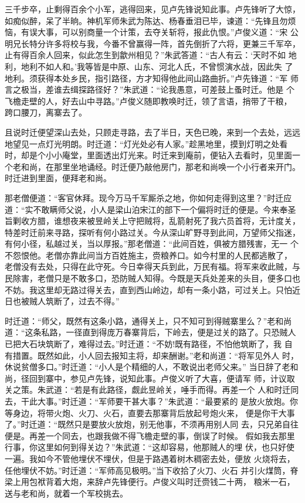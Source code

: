 三千步卒，止剩得百余个小军，逃得回来，见卢先锋说知此事。卢先锋听了大惊，
如痴似醉，呆了半晌。神机军师朱武为陈达、杨春垂泪已毕，谏道：“先锋且勿烦
恼，有误大事，可以别商量一个计策，去夺关斩将，报此仇恨。”卢俊义道：“宋
公明兄长特分许多将校与我，今番不曾赢得一阵，首先倒折了六将，更兼三千军卒，
止有得百余人回来，似此怎生到歙州相见？”朱武答道：“古人有云：‘天时不如
地利，地利不如人和。’我等皆是中原、山东、河北人氏，不曾惯演水战，因此失
了地利。须获得本处乡民，指引路径，方才知得他此间山路曲折。”卢先锋道：“军
师言之极当，差谁去缉探路径好？”朱武道：“论我愚意，可差鼓上蚤时迁。他是
个飞檐走壁的人，好去山中寻路。”卢俊义随即教唤时迁，领了言语，捎带了干粮，
跨口腰刀，离寨去了。

且说时迁便望深山去处，只顾走寻路，去了半日，天色已晚，来到一个去处，远远
地望见一点灯光明朗。时迁道：“灯光处必有人家。”趁黑地里，摸到灯明之处看
时，却是个小小庵堂，里面透出灯光来。时迁来到庵前，便钻入去看时，见里面一
个老和尚，在那里坐地诵经。时迁便乃敲他房门，那老和尚唤一个小行者来开门。
时迁进到里面，便拜老和尚。

那老僧便道：“客官休拜。现今万马千军厮杀之地，你如何走得到这里？”时迁应
道：“实不敢瞒师父说，小人是梁山泊宋江的部下一个偏将时迁的便是。今来奉圣
旨剿收方腊，谁想夜来被昱岭关上守把贼将，乱箭射死了我六员首将，无计度关，
特差时迁前来寻路，探听有何小路过关。今从深山旷野寻到此间，万望师父指迷，
有何小径，私越过关，当以厚报。”那老僧道：“此间百姓，俱被方腊残害，无一
个不怨恨他。老僧亦靠此间当方百姓施主，赍粮养口。如今村里的人民都逃散了，
老僧没有去处，只得在此守死。今日幸得天兵到此，万民有福。将军来收此贼，与
民除害，老僧只是不敢多口，恐防贼人知得。今既是天兵处差来的头目，便多口也
不妨。我这里却无路过得关去，直到西山岭边，却有一条小路，可过关上。只怕近
日也被贼人筑断了，过去不得。”

时迁道：“师父，既然有这条小路，通得关上，只不知可到得贼寨里么？”老和尚
道：“这条私路，一径直到得庞万春寨背后，下岭去，便是过关的路了。只恐贼人
已把大石块筑断了，难得过去。”时迁道：“不妨!既有路径，不怕他筑断了，我
自有措置。既然如此，小人回去报知主将，却来酬谢。”老和尚道：“将军见外人
时，休说贫僧多口。”时迁道：“小人是个精细的人，不敢说出老师父来。”
当日辞了老和尚，径回到寨中，参见卢先锋，说知此事。卢俊义听了大喜，便请军
师，计议取关之策。朱武道：“若是有此路径，觑此昱岭关，唾手而得。再差一个
人和时迁同去，干此大事。”时迁道：“军师要干甚大事？”朱武道：“最要紧的
是放火放炮。你等身边，将带火炮、火刀、火石，直要去那寨背后放起号炮火来，
便是你干大事了。”时迁道：“既然只是要放火放炮，别无他事，不须再用别人同
去，只兄弟自往便是。再差一个同去，也跟我做不得飞檐走壁的事，倒误了时候。
假如我去那里行事，你这里如何到得关边？”朱武道：“这却容易，他那贼人的埋
伏，也只好使一遍。我如今不管他埋伏不埋伏，但是于路遇着树木稠密去处，便放
火烧将去，任他埋伏不妨。”时迁道：“军师高见极明。”当下收拾了火刀、火石
并引火煤筒，脊梁上用包袱背着大炮，来辞卢先锋便行。卢俊义叫时迁赍钱二十两，
粮米一石，送与老和尚，就着一个军校挑去。

